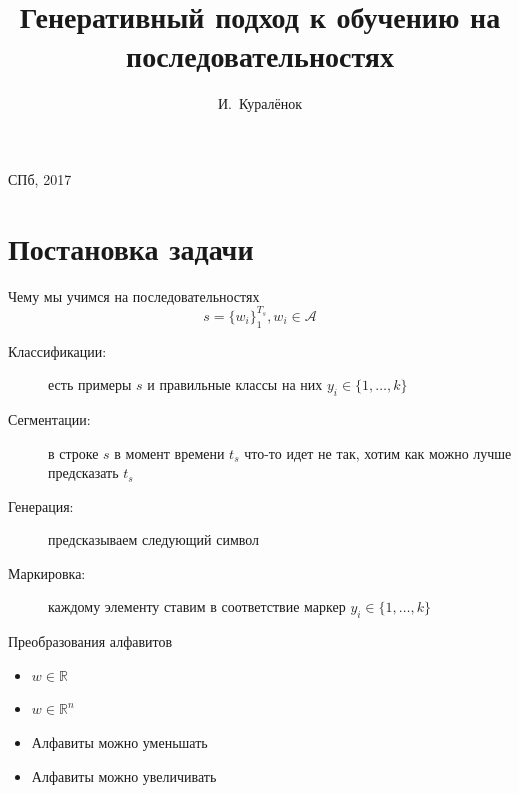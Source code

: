 \documentclass[14pt, fleqn, xcolor={dvipsnames, table}]{beamer}
\title{Генеративный подход к обучению на последовательностях}
\author[]{\small{%
И.~Куралёнок}}
\date{}
\begin{document}
\begin{frame}
\maketitle
\small
\begin{center}
\vspace{-60pt}
\vspace{80pt}
\footnotesize СПб, 2017
\end{center}
\end{frame}

\section{Постановка задачи}

\begin{frame}{Чему мы учимся на последовательностях}
$$
s = \{w_i\}_1^{T_s}, w_i \in \mathcal{A}
$$
\begin{description}
  \item[Классификации:] есть примеры $s$ и правильные классы на них $y_i \in \{1,\ldots,k\}$
  \item[Сегментации:] в строке $s$ в момент времени $t_s$ что-то идет не так, хотим как можно лучше предсказать $t_s$
  \item[Генерация:] предсказываем следующий символ
  \item[Маркировка:] каждому элементу ставим в соответствие маркер $y_i \in \{1,\ldots,k\}$
\end{description}
\end{frame}

\begin{frame}{Преобразования алфавитов}
\begin{itemize}
  \item $w \in \mathbb{R}$ 
  \item $w \in \mathbb{R}^n$ 
  \item Алфавиты можно уменьшать 
  \item Алфавиты можно увеличивать 
\end{itemize}
\end{frame}
\end{document}
